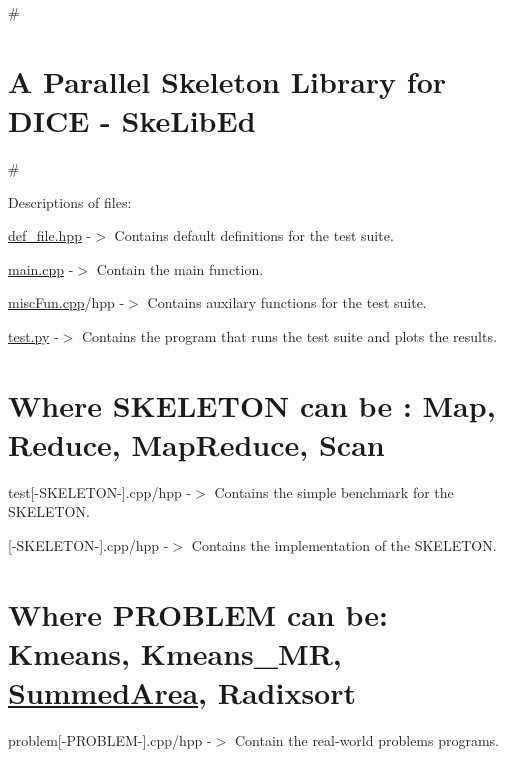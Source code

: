 \# \section*{A Parallel Skeleton Library for D\-I\-C\-E -\/ Ske\-Lib\-Ed}

\#

Descriptions of files\-:


\begin{DoxyItemize}
\item \hyperlink{def__file_8hpp}{def\-\_\-file.\-hpp} -\/$>$ Contains default definitions for the test suite.
\item \hyperlink{main_8cpp}{main.\-cpp} -\/$>$ Contain the main function.
\item \hyperlink{miscFun_8cpp}{misc\-Fun.\-cpp}/hpp -\/$>$ Contains auxilary functions for the test suite.
\item \hyperlink{test_8py}{test.\-py} -\/$>$ Contains the program that runs the test suite and plots the results.
\end{DoxyItemize}

\section*{Where S\-K\-E\-L\-E\-T\-O\-N can be \-: Map, Reduce, Map\-Reduce, Scan}


\begin{DoxyItemize}
\item test\mbox{[}-\/\-S\-K\-E\-L\-E\-T\-O\-N-\/\mbox{]}.cpp/hpp -\/$>$ Contains the simple benchmark for the S\-K\-E\-L\-E\-T\-O\-N.
\item \mbox{[}-\/\-S\-K\-E\-L\-E\-T\-O\-N-\/\mbox{]}.cpp/hpp -\/$>$ Contains the implementation of the S\-K\-E\-L\-E\-T\-O\-N.
\end{DoxyItemize}

\section*{Where P\-R\-O\-B\-L\-E\-M can be\-: Kmeans, Kmeans\-\_\-\-M\-R, \hyperlink{namespaceSummedArea}{Summed\-Area}, Radixsort}


\begin{DoxyItemize}
\item problem\mbox{[}-\/\-P\-R\-O\-B\-L\-E\-M-\/\mbox{]}.cpp/hpp -\/$>$ Contain the real-\/world problems programs. 
\end{DoxyItemize}